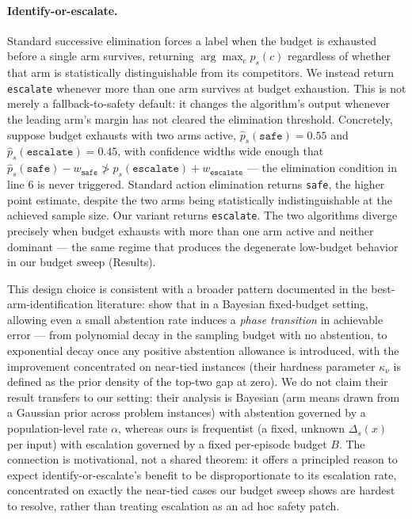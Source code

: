 \paragraph{Identify-or-escalate.} Standard successive elimination \citep{evendar2006} forces a label when the budget is exhausted before a single arm survives, returning $\arg\max_c \hat p_s(c)$ regardless of whether that arm is statistically distinguishable from its competitors. We instead return \texttt{escalate} whenever more than one arm survives at budget exhaustion. This is not merely a fallback-to-safety default: it changes the algorithm's output whenever the leading arm's margin has not cleared the elimination threshold. Concretely, suppose budget exhausts with two arms active, $\hat p_s(\texttt{safe}) = 0.55$ and $\hat p_s(\texttt{escalate}) = 0.45$, with confidence widths wide enough that $\hat p_s(\texttt{safe}) - w_{\texttt{safe}} \not> \hat p_s(\texttt{escalate}) + w_{\texttt{escalate}}$ — the elimination condition in line 6 is never triggered. Standard action elimination returns \texttt{safe}, the higher point estimate, despite the two arms being statistically indistinguishable at the achieved sample size. Our variant returns \texttt{escalate}. The two algorithms diverge precisely when budget exhausts with more than one arm active and neither dominant — the same regime that produces the degenerate low-budget behavior in our budget sweep (Results).

This design choice is consistent with a broader pattern documented in the best-arm-identification literature: \citet{huang2026abstention} show that in a Bayesian fixed-budget setting, allowing even a small abstention rate induces a \emph{phase transition} in achievable error — from polynomial decay in the sampling budget with no abstention, to exponential decay once any positive abstention allowance is introduced, with the improvement concentrated on near-tied instances (their hardness parameter $\kappa_\nu$ is defined as the prior density of the top-two gap at zero). We do not claim their result transfers to our setting: their analysis is Bayesian (arm means drawn from a Gaussian prior across problem instances) with abstention governed by a population-level rate $\alpha$, whereas ours is frequentist (a fixed, unknown $\Delta_s(x)$ per input) with escalation governed by a fixed per-episode budget $B$. The connection is motivational, not a shared theorem: it offers a principled reason to expect identify-or-escalate's benefit to be disproportionate to its escalation rate, concentrated on exactly the near-tied cases our budget sweep shows are hardest to resolve, rather than treating escalation as an ad hoc safety patch.

